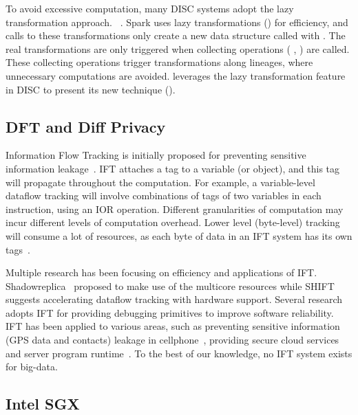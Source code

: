 To avoid excessive computation, many DISC systems adopt the lazy transformation 
approach.
~\cite{pig:vldb08,nsdi12:spark,osdi08:dryad}.
Spark uses lazy transformations (\eg {}) for efficiency,
and calls to these transformations only create a new data structure called 
 with .
The real transformations are only triggered when collecting operations (\eg 
{},
) are called. These collecting operations trigger transformations 
along
lineages, where unnecessary computations are avoided. \xxx leverages the lazy 
transformation
feature in DISC to present its new \lazyp technique ().

\vspace{-.15in}\subsection{DFT and Diff Privacy}
\label{sec:dft}\vspace{-.075in}

Information Flow Tracking is initially proposed for preventing sensitive 
information
leakage~\cite{dawn05:taint}.
IFT attaches a tag to a variable (or object),
and this tag will propagate throughout the computation.
For example, a variable-level dataflow tracking will involve combinations of
tags of two variables in each instruction, using an IOR operation.
Different granularities of computation may incur different levels
of computation overhead. Lower level (\eg byte-level) tracking will consume
a lot of resources, as each byte of data in an IFT system has its own 
tags~\cite{libdft:vee12}.
 
Multiple research has been focusing on efficiency and applications of IFT.
Shadowreplica~\cite{shadowreplica:ccs13} proposed to make use of the multicore 
resources while SHIFT~\cite{hardwardtaint:isca08}
suggests accelerating dataflow tracking with hardware support.
Several research~\cite{mit07:coverage,fse12:dtam} adopts IFT for providing 
debugging primitives
to improve software reliability.
IFT has been applied to various areas, such as preventing sensitive information 
(\eg GPS data and contacts)
leakage in cellphone~\cite{taintdroid:osdi10, cleanos:osdi12}, providing secure
cloud services~\cite{cloudfence:raid13} and server program 
runtime~\cite{libdft:vee12}.
To the best of
our knowledge, no IFT system exists for big-data.

\vspace{-.15in}\subsection{Intel SGX}
\label{sec:sgx}\vspace{-.075in}

